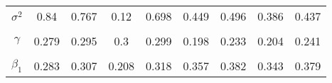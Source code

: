 \begin{footnotesize}
\begin{singlespace}
\begin{tabular}{ccccccccc}
$ \sigma^{2} $ & 0.84 & 0.767 & 0.12 & 0.698 & 0.449 & 0.496 & 0.386 & 0.437 \\ 
 & \begin{tiny} [0.757,0.915] \end{tiny}  & \begin{tiny} [0.71,0.821] \end{tiny}  & \begin{tiny} [0.108,0.131] \end{tiny}  & \begin{tiny} [0.649,0.749] \end{tiny}  & \begin{tiny} [0.424,0.474] \end{tiny}  & \begin{tiny} [0.466,0.521] \end{tiny}  & \begin{tiny} [0.356,0.404] \end{tiny}  & \begin{tiny} [0.409,0.462] \end{tiny}  \\ 
$\gamma$ & 0.279 & 0.295 & 0.3 & 0.299 & 0.198 & 0.233 & 0.204 & 0.241 \\ 
 & \begin{tiny} [0.274,0.286] \end{tiny}  & \begin{tiny} [0.29,0.301] \end{tiny}  & \begin{tiny} [0.295,0.305] \end{tiny}  & \begin{tiny} [0.294,0.304] \end{tiny}  & \begin{tiny} [0.191,0.204] \end{tiny}  & \begin{tiny} [0.228,0.239] \end{tiny}  & \begin{tiny} [0.198,0.21] \end{tiny}  & \begin{tiny} [0.236,0.247] \end{tiny}  \\ 
$ \beta_{1} $ & 0.283 & 0.307 & 0.208 & 0.318 & 0.357 & 0.382 & 0.343 & 0.379 \\ 

\end{tabular}
\end{singlespace}
\end{footnotesize}
